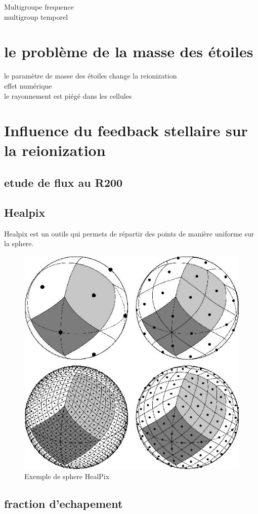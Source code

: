 Multigroupe frequence\\
multigroup temporel\\


\section{le problème de la masse des étoiles}

le paramètre de masse des étoiles change la reionization\\
effet numérique\\
le rayonnement est piégé dans les cellules\\






\section{Influence du feedback stellaire sur la reionization}

\subsection{etude de flux au R200}

\subsection{Healpix}
\label{sec:healpix}

Healpix est un outils qui permets de répartir des points de manière uniforme sur la sphere.

\begin{figure}[bth]
        \includegraphics[width=.95\linewidth]{img/03/healpix.jpg} 
        \caption{Exemple de sphere HealPix}
 		\label{fig:HealPix}
\end{figure}



\subsection{fraction d'echapement}

